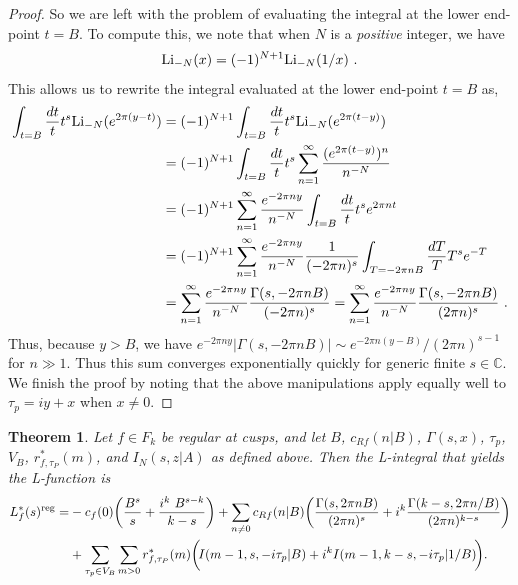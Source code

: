 \documentclass[11pt,a4paper]{article}
\newcommand{\G}{\Gamma}
\newtheorem{thm}{Theorem}[section]
\def\C{\mathbb{C}}
\newcommand{\reg}{{\rm reg}}
\begin{document}
\begin{proof}
So we are left with the problem of evaluating the integral at the lower end-point $t = B$. To compute this, we note that when $N$ is a {\em positive} integer, we have
\begin{align}
{\rm Li}_{-N}(x) = (-1)^{N+1} {\rm Li}_{-N}(1/x)~.
\end{align}
This allows us to rewrite the integral evaluated at the lower end-point $t = B$ as,
\begin{align}
\int_{t = B}\frac{dt}{t} t^s {\rm Li}_{-N}(e^{2 \pi (y-t)})
&= (-1)^{N+1}\int_{t = B}\frac{dt}{t} t^s {\rm Li}_{-N}(e^{2 \pi (t-y)})
\\
&= (-1)^{N+1}\int_{t = B}\frac{dt}{t} t^s \sum_{n = 1}^{\infty} \frac{(e^{2 \pi (t-y)})^n}{n^{-N}}
\\
&= (-1)^{N+1}\sum_{n = 1}^{\infty} \frac{e^{-2 \pi n y}}{n^{-N}} \int_{t = B}\frac{dt}{t} t^s e^{2 \pi n t} 
\\
&= (-1)^{N+1}\sum_{n = 1}^{\infty} \frac{e^{-2 \pi n y}}{n^{-N}} \frac{1}{(-2\pi n)^s} \int_{T = -2 \pi n B}
\frac{dT}{T} T^s e^{-T} 
\\
&= \sum_{n = 1}^{\infty} \frac{e^{-2 \pi n y} }{n^{-N}} 
\frac{\G(s,-2\pi n B)}{(-2 \pi n)^{s}} = \sum_{n = 1}^{\infty} \frac{e^{-2 \pi n y} }{n^{-N}} 
\frac{\G(s,-2\pi n B)}{(2 \pi n)^{s}}~.
\end{align}
Thus, because $y > B$, we have $e^{-2\pi n y} |\G(s,-2\pi n B)| \sim e^{-2 \pi n (y-B)}/(2 \pi n)^{s-1}$ for $n \gg 1$. Thus this sum converges exponentially quickly for generic finite $s \in \C$. We finish the proof by noting that the above manipulations apply equally well to $\tau_p = i y + x$ when $x \neq 0$.
\end{proof}

\begin{thm}\label{ThmLfn}
Let $f \in F_k$ be regular at cusps, and let $B$, $c_{Rf}(n|B)$, $\G(s,x)$, $\tau_p$, $V_B$, $r^*_{f,\tau_P}(m)$, and $I_N(s,z|A)$ as defined above. Then the L-integral that yields the L-function is
\begin{align} 
L_f^*(s)^{\reg} =&-c_f(0) \bigg(\frac{B^s}{s} + \frac{i^k~B^{s-k}}{k-s} \bigg) + \sum_{n \neq 0} c_{Rf}(n|B) \bigg( \frac{\G(s,2\pi n B)}{(2\pi n)^s}  + i^k \frac{\G(k-s,2\pi n/B)}{(2\pi n)^{k-s}}  \bigg) \nonumber\\
&+\sum_{\tau_p \in V_B} \sum_{m > 0} r^*_{f,\tau_P}(m) \bigg( \! I(m-1,s,-i\tau_p|B) + i^k I(m-1,k-s,-i\tau_p|1/B) \! \bigg).\!
\label{eqLfn}
\end{align}
\end{thm}
\end{document}
